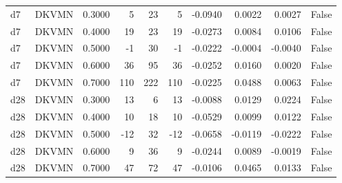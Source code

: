 \begin{tabular}{llrrrrrrrr}
d7 & DKVMN & 0.3000 & 5 & 23 & 5 & -0.0940 & 0.0022 & 0.0027 & False \\
d7 & DKVMN & 0.4000 & 19 & 23 & 19 & -0.0273 & 0.0084 & 0.0106 & False \\
d7 & DKVMN & 0.5000 & -1 & 30 & -1 & -0.0222 & -0.0004 & -0.0040 & False \\
d7 & DKVMN & 0.6000 & 36 & 95 & 36 & -0.0252 & 0.0160 & 0.0020 & False \\
d7 & DKVMN & 0.7000 & 110 & 222 & 110 & -0.0225 & 0.0488 & 0.0063 & False \\
d28 & DKVMN & 0.3000 & 13 & 6 & 13 & -0.0088 & 0.0129 & 0.0224 & False \\
d28 & DKVMN & 0.4000 & 10 & 18 & 10 & -0.0529 & 0.0099 & 0.0122 & False \\
d28 & DKVMN & 0.5000 & -12 & 32 & -12 & -0.0658 & -0.0119 & -0.0222 & False \\
d28 & DKVMN & 0.6000 & 9 & 36 & 9 & -0.0244 & 0.0089 & -0.0019 & False \\
d28 & DKVMN & 0.7000 & 47 & 72 & 47 & -0.0106 & 0.0465 & 0.0133 & False \\
\bottomrule
\end{tabular}
